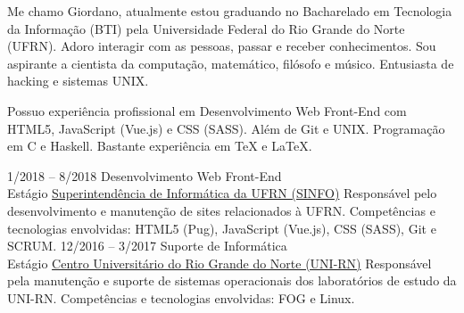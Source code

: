 \documentclass[9pt]{developercv}
\begin{document}
	\maketitle

	\begin{minipage}[t]{1\textwidth}
		Me chamo Giordano, atualmente estou gradu\-ando no Bacharelado em Tecnologia da Informação (BTI) pela Universidade Federal do Rio Grande do Norte (UFRN).
		Adoro interagir com as pessoas, passar e receber conhecimentos. Sou aspirante a cientista da computação, matemático, filósofo e músico. Entusiasta de hacking e sistemas UNIX. 
	\end{minipage}
	
	\begin{minipage}[t]{1\textwidth}
		Possuo experiência profissional em Desenvolvimento Web Front-End com HTML5, JavaScript (Vue.js) e CSS (SASS). Além de Git e UNIX. Programação em C e Haskell. Bastante experiência em \TeX{} e \LaTeX{}.
	\end{minipage}


	\begin{entrylist}
		\entry
			{1/2018 -- 8/2018}
			{Desenvolvimento Web Front-End\\
				\footnotesize{Estágio}}
			{\href{https://www.info.ufrn.br/}{Superintendência de Informática da UFRN (SINFO)}}
			{Responsável pelo desenvolvimento e manutenção de sites relacionados à UFRN.
				Competências e tecnologias envolvidas: HTML5 (Pug), JavaScript (Vue.js), CSS (SASS), Git e SCRUM.}
		\entry
			{12/2016 -- 3/2017}
			{Suporte de Informática\\
				\footnotesize{Estágio}}
			{\href{http://unirn.edu.br/}{Centro Universitário do Rio Grande do Norte (UNI-RN)}}
			{Responsável pela manutenção e suporte de sistemas operacionais dos laboratórios de estudo da UNI-RN.
				Competências e tecnologias envolvidas: FOG e Linux.}
	\end{entrylist}
\end{document}
